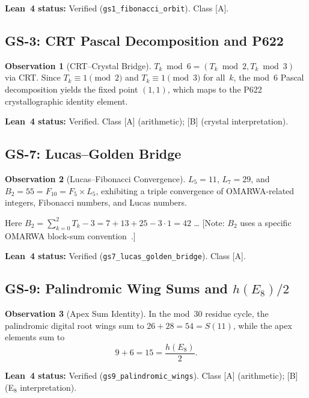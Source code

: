 \documentclass[11pt, a4paper]{article}
\theoremstyle{plain}
\theoremstyle{definition}
\newtheorem{observation}{Observation}[section]
\theoremstyle{remark}
\begin{document}
\textbf{Lean~4 status:} Verified (\texttt{gs1\_fibonacci\_orbit}). Class [A].

\subsection{GS-3: CRT Pascal Decomposition and P622}

\begin{observation}[CRT--Crystal Bridge]
\label{obs:gs3}
$T_k \bmod 6 = (T_k \bmod 2, T_k \bmod 3)$ via CRT.
Since $T_k \equiv 1 \pmod{2}$ and $T_k \equiv 1 \pmod{3}$ for all~$k$,
the mod~6 Pascal decomposition yields the fixed point $(1,1)$,
which maps to the P622 crystallographic identity element.
\end{observation}

\textbf{Lean~4 status:} Verified. Class [A] (arithmetic); [B] (crystal interpretation).

\subsection{GS-7: Lucas--Golden Bridge}

\begin{observation}[Lucas--Fibonacci Convergence]
\label{obs:gs7}
$L_5 = 11$, $L_7 = 29$, and $B_2 = 55 = F_{10} = F_5 \times L_5$,
exhibiting a triple convergence of OMARWA-related integers, Fibonacci
numbers, and Lucas numbers.
\end{observation}

Here $B_2 = \sum_{k=0}^{2} T_k - 3 = 7 + 13 + 25 - 3 \cdot 1 = 42$
\ldots{} [Note: $B_2$ uses a specific OMARWA block-sum
convention~\cite{paket2}.]

\textbf{Lean~4 status:} Verified (\texttt{gs7\_lucas\_golden\_bridge}). Class [A].

\subsection{GS-9: Palindromic Wing Sums and $h(E_8)/2$}

\begin{observation}[Apex Sum Identity]
\label{obs:gs9}
In the mod~30 residue cycle, the palindromic digital root wings sum to
$26 + 28 = 54 = S(11)$, while the apex elements sum to
\begin{equation}
9 + 6 = 15 = \frac{h(E_8)}{2}.
\end{equation}
\end{observation}

\textbf{Lean~4 status:} Verified (\texttt{gs9\_palindromic\_wings}). Class [A] (arithmetic);
[B] (E$_8$ interpretation).
\end{document}
